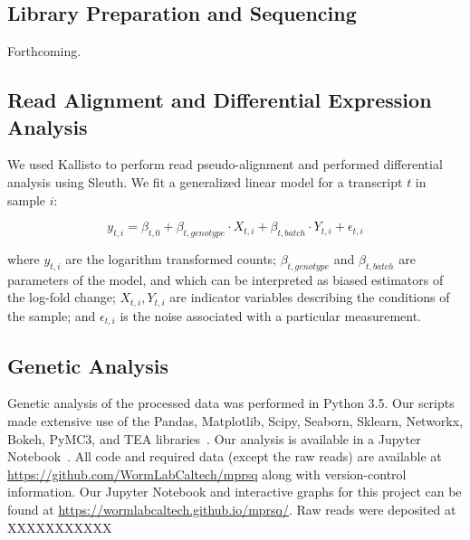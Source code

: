 \documentclass[9pt,twocolumn,twoside]{pnas-new}
\begin{document}
{\subsection*{Library Preparation and Sequencing}
Forthcoming.

\subsection*{Read Alignment and Differential Expression Analysis}
We used Kallisto to perform read pseudo-alignment and performed differential
analysis using Sleuth. We fit a generalized linear model for a transcript $t$ in
sample $i$:

\begin{equation}
  y_{t,i} = \beta_{t, 0} + \beta_{t, genotype}\cdot{}X_{t, i} +
  \beta_{t, batch}\cdot{}Y_{t, i} + \epsilon_{t, i}
\end{equation}

where $y_{t, i}$ are the logarithm transformed counts; $\beta_{t, genotype}$ and
$\beta_{t, batch}$ are parameters of the model, and which can be interpreted as
biased estimators of the log-fold change; $X_{t, i}, Y_{t, i}$ are indicator
variables describing the conditions of the sample; and $\epsilon_{t, i}$ is the
noise associated with a particular measurement.

\subsection*{Genetic Analysis}
Genetic analysis of the processed data was performed in Python 3.5. Our scripts
made extensive use of the Pandas, Matplotlib, Scipy, Seaborn, Sklearn, Networkx,
Bokeh, PyMC3, and TEA libraries~\cite{Team2014,McKinney2011,Oliphant2007,
Pedregosa2012,Salvatier2015,VanDerWalt2011,Hunter2007,Angeles-Albores2016,Waskom}.
Our analysis is available in a Jupyter Notebook~\cite{Perez2007}. All code and
required data (except the raw reads) are available at
\url{https://github.com/WormLabCaltech/mprsq} along with version-control
information. Our Jupyter Notebook and interactive graphs for this project can be
found at \url{https://wormlabcaltech.github.io/mprsq/}. Raw reads were deposited
at XXXXXXXXXXX
}

\showmatmethods{}%


\showacknow{} %



\end{document}
